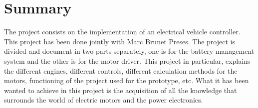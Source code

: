\chapter{Summary}
\label{chap:Summary}

The project consists on the implementation of an electrical vehicle controller. This project has been done jointly with Marc Brunet Preses. The project is divided and document in two parts separately, one is for the battery management system and the other is for the motor driver. This project in particular, explains the different engines, different controls, different calculation methods for the motors, functioning of the project used for the prototype, etc. What it has been wanted to achieve in this project is the acquisition of all the knowledge that surrounds the world of electric motors and the power electronics.



